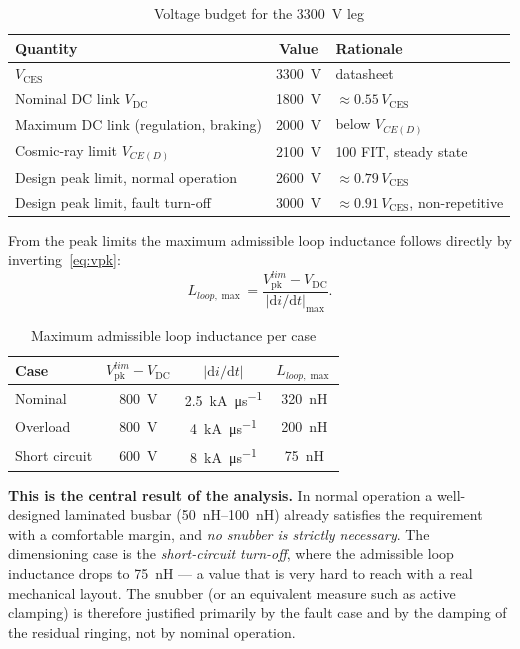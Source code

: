 \documentclass[11pt,a4paper]{article}
\newcommand{\Vces}{V_{\mathrm{CES}}}
\newcommand{\Vdc}{V_{\mathrm{DC}}}
\newcommand{\Vpk}{V_{\mathrm{pk}}}
\begin{document}
\begin{table}[htbp]
\centering
\caption{Voltage budget for the \SI{3300}{\volt} leg}
\label{tab:budget}
\begin{tabular}{lcl}
\toprule
Quantity & Value & Rationale \\
\midrule
$\Vces$                                & \SI{3300}{\volt} & datasheet \\
Nominal DC link $\Vdc$                 & \SI{1800}{\volt} & $\approx 0.55\,\Vces$ \\
Maximum DC link (regulation, braking)  & \SI{2000}{\volt} & below $V_{CE(D)}$ \\
Cosmic-ray limit $V_{CE(D)}$           & \SI{2100}{\volt} & 100 FIT, steady state \\
Design peak limit, normal operation    & \SI{2600}{\volt} & $\approx 0.79\,\Vces$ \\
Design peak limit, fault turn-off      & \SI{3000}{\volt} & $\approx 0.91\,\Vces$, non-repetitive \\
\bottomrule
\end{tabular}
\end{table}

From the peak limits the maximum admissible loop inductance follows directly
by inverting~\eqref{eq:vpk}:
\begin{equation}
L_{loop,\max} = \frac{\Vpk^{lim} - \Vdc}{|\mathrm{d}i/\mathrm{d}t|_{\max}}.
\label{eq:lmax}
\end{equation}

\begin{table}[htbp]
\centering
\caption{Maximum admissible loop inductance per case}
\label{tab:lmax}
\begin{tabular}{lccc}
\toprule
Case & $\Vpk^{lim} - \Vdc$ & $|\mathrm{d}i/\mathrm{d}t|$ & $L_{loop,\max}$ \\
\midrule
Nominal       & \SI{800}{\volt} & \SI{2.5}{\kilo\ampere\per\micro\second} & \SI{320}{\nano\henry} \\
Overload      & \SI{800}{\volt} & \SI{4}{\kilo\ampere\per\micro\second}   & \SI{200}{\nano\henry} \\
Short circuit & \SI{600}{\volt} & \SI{8}{\kilo\ampere\per\micro\second}   & \SI{75}{\nano\henry} \\
\bottomrule
\end{tabular}
\end{table}

\textbf{This is the central result of the analysis.} In normal operation a
well-designed laminated busbar (\SIrange{50}{100}{\nano\henry}) already
satisfies the requirement with a comfortable margin, and \emph{no snubber is
strictly necessary}. The dimensioning case is the \emph{short-circuit
turn-off}, where the admissible loop inductance drops to
\SI{75}{\nano\henry} --- a value that is very hard to reach with a real
mechanical layout. The snubber (or an equivalent measure such as active
clamping) is therefore justified primarily by the fault case and by the
damping of the residual ringing, not by nominal operation.
\end{document}
